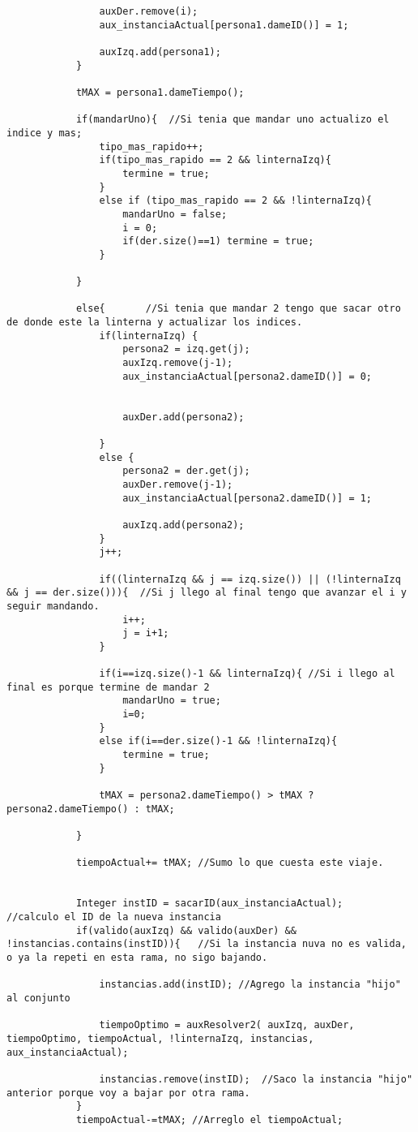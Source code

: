 \begin{lstlisting}
				auxDer.remove(i);
				aux_instanciaActual[persona1.dameID()] = 1;
				
				auxIzq.add(persona1);
			}

			tMAX = persona1.dameTiempo();

			if(mandarUno){	//Si tenia que mandar uno actualizo el indice y mas;
				tipo_mas_rapido++;
				if(tipo_mas_rapido == 2 && linternaIzq){
					termine = true;
				}
				else if (tipo_mas_rapido == 2 && !linternaIzq){
					mandarUno = false;
					i = 0;
					if(der.size()==1) termine = true;
				}

			}

			else{		//Si tenia que mandar 2 tengo que sacar otro de donde este la linterna y actualizar los indices.
				if(linternaIzq) {
					persona2 = izq.get(j);
					auxIzq.remove(j-1);
					aux_instanciaActual[persona2.dameID()] = 0;

					
					auxDer.add(persona2);
					
				}
				else {
					persona2 = der.get(j);
					auxDer.remove(j-1);
					aux_instanciaActual[persona2.dameID()] = 1;
					
					auxIzq.add(persona2);
				}
				j++;

				if((linternaIzq && j == izq.size()) || (!linternaIzq && j == der.size())){	//Si j llego al final tengo que avanzar el i y seguir mandando.
					i++;
					j = i+1;
				}

				if(i==izq.size()-1 && linternaIzq){	//Si i llego al final es porque termine de mandar 2
					mandarUno = true;
					i=0;
				}
				else if(i==der.size()-1 && !linternaIzq){
					termine = true;
				}

				tMAX = persona2.dameTiempo() > tMAX ? persona2.dameTiempo() : tMAX;

			}

			tiempoActual+= tMAX; //Sumo lo que cuesta este viaje.
			
			
			Integer instID = sacarID(aux_instanciaActual);			//calculo el ID de la nueva instancia				
			if(valido(auxIzq) && valido(auxDer) && !instancias.contains(instID)){	//Si la instancia nuva no es valida, o ya la repeti en esta rama, no sigo bajando.
			
				instancias.add(instID);	//Agrego la instancia "hijo" al conjunto 
				
				tiempoOptimo = auxResolver2( auxIzq, auxDer, tiempoOptimo, tiempoActual, !linternaIzq, instancias, aux_instanciaActual);
				
				instancias.remove(instID);	//Saco la instancia "hijo" anterior porque voy a bajar por otra rama.
			}
			tiempoActual-=tMAX;	//Arreglo el tiempoActual;


\end{lstlisting}
